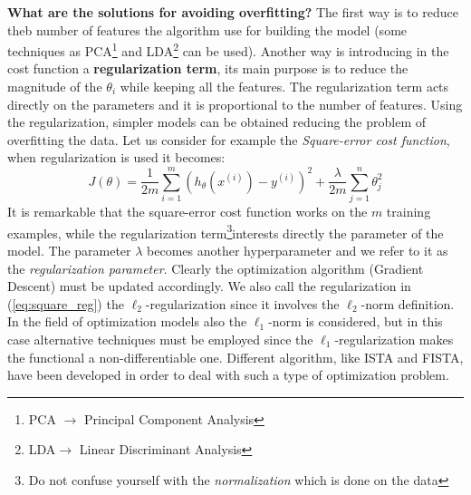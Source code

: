 \noindent
\textbf{What are the solutions for avoiding overfitting?} The first way is to reduce theb number of features the algorithm use for building the model (some techniques as PCA\footnote{
    PCA $\to$ Principal Component Analysis
} and LDA\footnote{
LDA$\to$ Linear Discriminant Analysis} can be used). Another way is introducing in the cost function a \textbf{regularization term}, its main purpose is to reduce the magnitude of the $\theta_i$ while keeping all the features. The regularization term acts directly on the parameters and it is proportional to the number of features. Using the regularization, simpler models can be obtained reducing the problem of overfitting the data. Let us consider for example the \textit{Square-error cost function}, when regularization is used it becomes:
\begin{equation} \label{eq:square_reg}
    J(\theta) = \frac{1}{2m} \sum_{i=1}^{m} (h_\theta(x^{(i)})-y^{(i)})^2 + \frac{\lambda}{2m} 
    \sum_{j=1}^{n} \theta_{j}^{2} 
\end{equation}
It is remarkable that the square-error cost function works on the $m$ training examples, while the regularization term\footnote{
    Do not confuse yourself with the \textit{normalization} which is done on the data
}interests directly the parameter of the model. The parameter $\lambda$ becomes another hyperparameter and we refer to it as the \textit{regularization parameter}. Clearly the optimization algorithm (Gradient Descent) must be updated accordingly. We also call the regularization in (\ref{eq:square_reg}) the $\ell_2$-regularization since it involves the $\ell_2$-norm definition. In the field of optimization models also the $\ell_1$-norm is considered, but in this case alternative techniques must be employed since the $\ell_1$-regularization makes the functional a non-differentiable one. Different algorithm, like ISTA and FISTA, have been developed in order to deal with such a type of optimization problem.